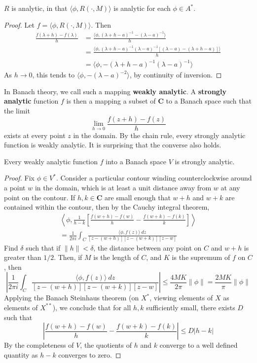 \begin{lemma}
    $R$ is analytic, in that $\langle \phi, R(\cdot, M) \rangle$ is analytic for each $\phi \in A^*$.
\end{lemma}
\begin{proof}
    Let $f = \langle \phi, R(\cdot, M) \rangle$. Then
    \begin{align*}
        \frac{f(\lambda + h) - f(\lambda)}{h} &= \frac{\langle \phi, (\lambda + h - a)^{-1} - (\lambda - a)^{-1} \rangle}{h}\\
        &= \frac{\langle \phi, (\lambda + h - a)^{-1} (\lambda - a)^{-1} [(\lambda - a) - (\lambda + h - a)] \rangle}{h}\\
        &= \langle \phi, -(\lambda + h - a)^{-1} (\lambda - a)^{-1} \rangle
    \end{align*}
    As $h \to 0$, this tends to $\langle \phi, - (\lambda - a)^{-2} \rangle$, by continuity of inversion.
\end{proof}

In Banach theory, we call such a mapping {\bf weakly analytic}. A {\bf strongly analytic} function $f$ is then a mapping a subset of $\mathbf{C}$ to a Banach space such that the limit
%
\[ \lim_{h \to 0} \frac{f(z + h) - f(z)}{h} \]
%
exists at every point $z$ in the domain. By the chain rule, every strongly analytic function is weakly analytic. It is surprising that the converse also holds.

\begin{theorem}
    Every weakly analytic function $f$ into a Banach space $V$ is strongly analytic.
\end{theorem}
\begin{proof}
    Fix $\phi \in V^*$. Consider a particular contour winding counterclockwise around a point $w$ in the domain, which is at least a unit distance away from $w$ at any point on the contour. If $h,k \in \mathbf{C}$ are small enough that $w + h$ and $w + k$ are contained within the contour, then by the Cauchy integral theorem,
    \begin{align*}
        \left\langle \phi, \frac{1}{h-k} \left[ \frac{f(w + h) - f(w)}{h} - \frac{f(w + k) - f(k)}{k} \right] \right\rangle\\
        = \frac{1}{2\pi i} \int_C \frac{\langle \phi, f(z) \rangle\ dz}{[z - (w + h)][z - (w + k)][z - w]}
    \end{align*}
    Find $\delta$ such that if $\| h \| < \delta$, the distance between any point on $C$ and $w + h$ is greater than $1/2$. Then, if $M$ is the length of $C$, and $K$ is the supremum of $f$ on $C$, then
    \[ \left| \frac{1}{2\pi i} \int_C \frac{\langle \phi, f(z) \rangle\ dz}{[z - (w + h)][z - (w + k)][z - w]}\right| \leq \frac{4MK}{2 \pi} \| \phi \| = \frac{2MK}{\pi} \| \phi \| \]
    Applying the Banach Steinhaus theorem (on $X^*$, viewing elements of $X$ as elements of $X^{**}$), we conclude that for all $h,k$ sufficiently small, there exists $D$ such that
    \[ \left| \frac{f(w + h) - f(w)}{h} - \frac{f(w + k) - f(k)}{k} \right| \leq D |h - k| \]
    By the completeness of $V$, the quotients of $h$ and $k$ converge to a well defined quantity as $h - k$ converges to zero.
\end{proof}

